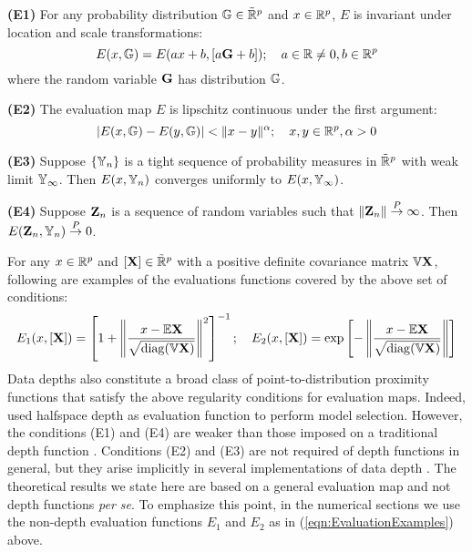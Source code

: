 \noindent\textbf{(E1)} For any probability distribution $\mathbb{G} \in \tilde {\mathbb{R}}^p$ and ${x} \in \mathbb{R}^p$, $E$ is invariant under location and scale transformations:
%
$$
E( {x}, \mathbb{G}) = E( a{x} + {b}, [a {\mathbf{G}} + {b}]); \quad a \in \mathbb{R} \neq 0, {b} \in \mathbb{R}^p
$$
%
where the random variable ${\mathbf{G}}$ has distribution $\mathbb{G}$.

\noindent\textbf{(E2)} The evaluation map $E$ is lipschitz continuous under the first argument:
%
$$
| E( {x}, \mathbb{G}) - E( {y}, \mathbb{G}) | < \| {x} - {y} \|^\alpha; \quad {x}, {y} \in \mathbb{R}^p, \alpha > 0
$$

\noindent\textbf{(E3)}
Suppose $\{ \mathbb{Y}_n \}$ is a tight sequence of probability measures in $\tilde {\mathbb{R}}^p$ with weak limit $\mathbb{Y}_\infty$. Then $E( {x}, \mathbb{Y}_n)$ converges uniformly to $E({x}, \mathbb{Y}_\infty)$.

\noindent\textbf{(E4)}
Suppose ${\mathbf{Z}}_n$ is a sequence of random variables such that $\| {\mathbf{Z}}_n \| \stackrel{P}{\rightarrow} \infty$. Then $E( {\mathbf{Z}}_n, \mathbb{Y}_n) \stackrel{P}{\rightarrow} 0$.
\vspace{1em}

For any ${x} \in \mathbb{R}^p$ and $[ {\mathbf{X}} ] \in \tilde {\mathbb{R}}^p$ with a positive definite covariance matrix $\mathbb{V} {\mathbf{X}}$, following are examples of the evaluations functions covered by the above set of conditions:
%
\begin{align}\label{eqn:EvaluationExamples}
E_1 ({x}, [ {\mathbf{X}}]) = \left[ 1 + \left\| \frac{{x} - \mathbb{E} {\mathbf{X}} }{ \sqrt { {\mathrm {diag}}  (\mathbb{V} {\mathbf{X}}) }}  \right\|^2 \right]^{-1}; \quad
E_2 ({x}, [ {\mathbf{X}}]) = \exp \left[ - \left\| \frac{{x} - \mathbb{E} {\mathbf{X}} }{ \sqrt { {\mathrm {diag}}  (\mathbb{V} {\mathbf{X}}) }}  \right\| \right]
\end{align}
%
Data depths \citep{tukey75, zuo00, zuo03} also constitute a broad class of point-to-distribution proximity functions that satisfy the above regularity conditions for evaluation maps. Indeed, \cite{MajumdarChatterjee17} used halfspace depth \citep{tukey75} as evaluation function to perform model selection. However, the conditions (E1) and (E4) are weaker than those imposed on a traditional depth function \citep{zuo00}. Conditions (E2) and (E3) are not required of depth functions in general, but they arise implicitly in several implementations of data depth \citep{MoslerChapter13}. The theoretical results we state here are based on a general evaluation map and not depth functions \textit{per se}. To emphasize this point, in the numerical sections we use the non-depth evaluation functions $E_1$ and $E_2$ as in (\ref{eqn:EvaluationExamples}) above.

